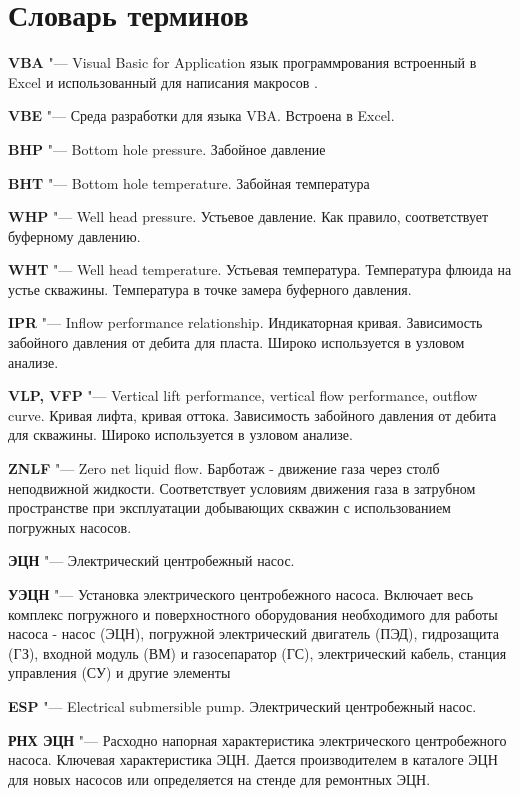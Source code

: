 \chapter*{Словарь терминов}             %

\textbf{VBA} "--- Visual Basic for Application язык программрования встроенный в Excel и использованный для написания макросов \unf.

\textbf{VBE} "--- Среда разработки для языка VBA. Встроена в Excel.

\textbf{BHP} "--- Bottom hole pressure. Забойное давление

\textbf{BHT} "--- Bottom hole temperature. Забойная температура

\textbf{WHP} "--- Well head pressure. Устьевое давление. Как правило, соответствует буферному давлению.

\textbf{WHT} "--- Well head temperature. Устьевая температура. Температура флюида на устье скважины. Температура в точке замера буферного давления.

\textbf{IPR} "--- Inflow performance relationship. Индикаторная кривая. Зависимость забойного давления от дебита для пласта. Широко используется в узловом анализе.

\textbf{VLP, VFP} "--- Vertical lift performance, vertical flow performance, outflow curve. Кривая лифта, кривая оттока. Зависимость забойного давления от дебита для скважины. Широко используется в узловом анализе.

\textbf{ZNLF} "--- Zero net liquid flow. Барботаж - движение газа через столб неподвижной жидкости. Соответствует условиям движения газа в затрубном пространстве при эксплуатации добывающих скважин с использованием погружных насосов.

\textbf{ЭЦН} "--- Электрический центробежный насос.

\textbf{УЭЦН} "--- Установка электрического центробежного насоса. Включает весь комплекс погружного и поверхностного оборудования необходимого для работы насоса - насос (ЭЦН), погружной электрический двигатель (ПЭД), гидрозащита (ГЗ), входной модуль (ВМ) и газосепаратор (ГС), электрический кабель, станция управления (СУ) и другие элементы

\textbf{ESP} "--- Electrical submersible pump. Электрический центробежный насос.

\textbf{РНХ ЭЦН} "--- Расходно напорная характеристика электрического центробежного насоса. Ключевая характеристика ЭЦН. Дается производителем в каталоге ЭЦН для новых насосов или определяется на стенде для ремонтных ЭЦН. 